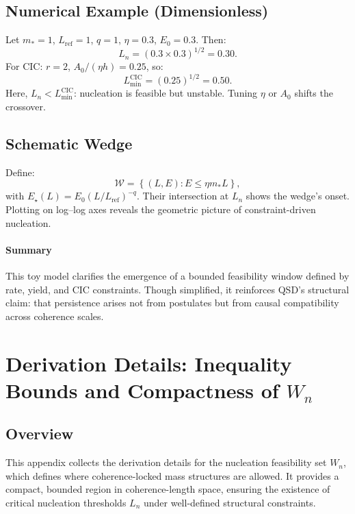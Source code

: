 \documentclass[preprints,article,submit,pdftex,moreauthors]{Definitions/mdpi}
\begin{document}
\subsection[\appendixname~\thesubsection]{Numerical Example (Dimensionless)}
Let \( m_\ast = 1 \), \( L_{\mathrm{ref}} = 1 \), \( q = 1 \), \( \eta = 0.3 \), \( E_0 = 0.3 \). Then:
\[
L_n = \left( 0.3 \times 0.3 \right)^{1/2} = 0.30.
\]
For CIC: \( r = 2 \), \( A_0 / (\eta h) = 0.25 \), so:
\[
L_{\min}^{\mathrm{CIC}} = (0.25)^{1/2} = 0.50.
\]
Here, \( L_n < L_{\min}^{\mathrm{CIC}} \): nucleation is feasible but unstable. Tuning \( \eta \) or \( A_0 \) shifts the crossover.

\subsection[\appendixname~\thesubsection]{Schematic Wedge}
Define:
\[
\mathcal{W} = \left\{ (L, E): E \le \eta m_\ast L \right\},
\]
with \( E_\star(L) = E_0(L/L_{\mathrm{ref}})^{-q} \). Their intersection at \( L_n \) shows the wedge's onset. Plotting on log–log axes reveals the geometric picture of constraint-driven nucleation.

\paragraph*{Summary}
This toy model clarifies the emergence of a bounded feasibility window defined by rate, yield, and CIC constraints. Though simplified, it reinforces QSD’s structural claim: that persistence arises not from postulates but from causal compatibility across coherence scales.


\section[\appendixname~\thesection]{Derivation Details: Inequality Bounds and Compactness of \texorpdfstring{$W_n$}{Wn}}
\subsection[\appendixname~\thesubsection]{Overview}

This appendix collects the derivation details for the nucleation feasibility set \( W_n \), which defines where coherence-locked mass structures are allowed. It provides a compact, bounded region in coherence-length space, ensuring the existence of critical nucleation thresholds \( L_n \) under well-defined structural constraints.
\end{document}
